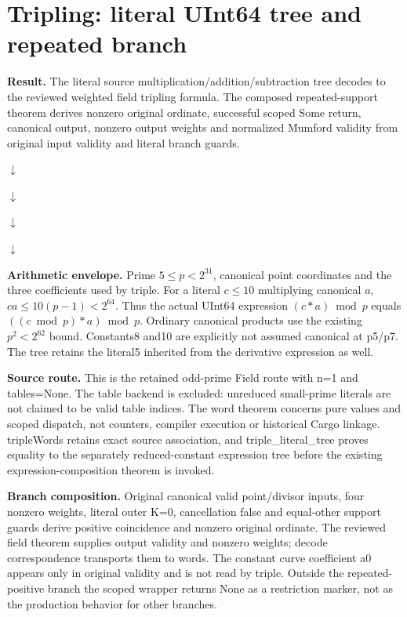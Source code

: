 \documentclass[10pt]{article}
\begin{document}
\section*{Tripling: literal UInt64 tree and repeated branch}
\textbf{Result.} The literal source multiplication/addition/subtraction tree decodes to the reviewed weighted field tripling formula. The composed repeated-support theorem derives nonzero original ordinate, successful scoped Some return, canonical output, nonzero output weights and normalized Mumford validity from original input validity and literal branch guards.

\begin{center}\par $\downarrow$\par
{}\par $\downarrow$\par
{}\par $\downarrow$\par
{}\par $\downarrow$\par
{}\end{center}

\textbf{Arithmetic envelope.} Prime $5\le p<2^{31}$, canonical point coordinates and the three coefficients used by triple. For a literal $c\le10$ multiplying canonical $a$, $ca\le10(p-1)<2^{64}$. Thus the actual UInt64 expression $(c*a)\bmod p$ equals $((c\bmod p)*a)\bmod p$. Ordinary canonical products use the existing $p^2<2^{62}$ bound. Constants8 and10 are explicitly not assumed canonical at p5/p7. The tree retains the literal5 inherited from the derivative expression as well.

\textbf{Source route.} This is the retained odd-prime Field route with n=1 and tables=None. The table backend is excluded: unreduced small-prime literals are not claimed to be valid table indices. The word theorem concerns pure values and scoped dispatch, not counters, compiler execution or historical Cargo linkage. tripleWords retains exact source association, and triple\_literal\_tree proves equality to the separately reduced-constant expression tree before the existing expression-composition theorem is invoked.

\textbf{Branch composition.} Original canonical valid point/divisor inputs, four nonzero weights, literal outer K=0, cancellation false and equal-other support guards derive positive coincidence and nonzero original ordinate. The reviewed field theorem supplies output validity and nonzero weights; decode correspondence transports them to words. The constant curve coefficient a0 appears only in original validity and is not read by triple. Outside the repeated-positive branch the scoped wrapper returns None as a restriction marker, not as the production behavior for other branches.
\end{document}
